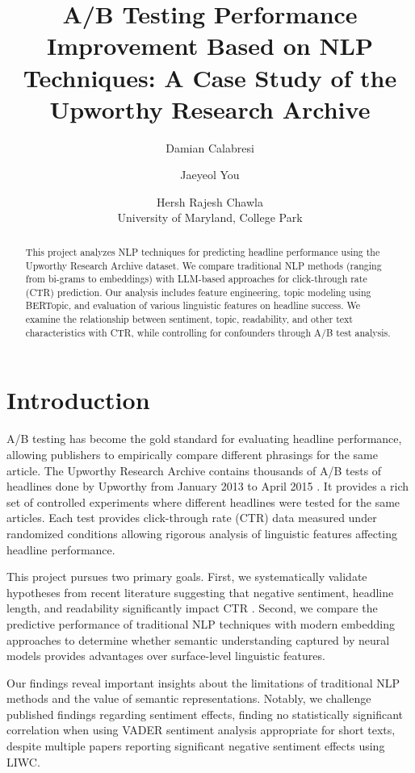 \documentclass[11pt]{article}
\title{A/B Testing Performance Improvement Based on NLP Techniques: A Case Study of the Upworthy Research Archive}
\author{
  Damian Calabresi \and
  Jaeyeol You \and
  Hersh Rajesh Chawla \\
  University of Maryland, College Park
}
\begin{document}
\maketitle

\begin{abstract}
This project analyzes NLP techniques for predicting headline performance using the Upworthy Research Archive dataset. We compare traditional NLP methods (ranging from bi-grams to embeddings) with LLM-based approaches for click-through rate (CTR) prediction. Our analysis includes feature engineering, topic modeling using BERTopic, and evaluation of various linguistic features on headline success. We examine the relationship between sentiment, topic, readability, and other text characteristics with CTR, while controlling for confounders through A/B test analysis.
\end{abstract}

\section{Introduction}

A/B testing has become the gold standard for evaluating headline performance, allowing publishers to empirically compare different phrasings for the same article. The Upworthy Research Archive contains thousands of A/B tests of headlines done by Upworthy from January 2013 to April 2015 \cite{matias2021upworthy}. It provides a rich set of controlled experiments where different headlines were tested for the same articles. Each test provides click-through rate (CTR) data measured under randomized conditions allowing rigorous analysis of linguistic features affecting headline performance.

This project pursues two primary goals. First, we systematically validate hypotheses from recent literature suggesting that negative sentiment, headline length, and readability significantly impact CTR \cite{robertson2023negativity, munger2023linguistic}. Second, we compare the predictive performance of traditional NLP techniques with modern embedding approaches to determine whether semantic understanding captured by neural models provides advantages over surface-level linguistic features.

Our findings reveal important insights about the limitations of traditional NLP methods and the value of semantic representations. Notably, we challenge published findings regarding sentiment effects, finding no statistically significant correlation when using VADER sentiment analysis appropriate for short texts, despite multiple papers reporting significant negative sentiment effects using LIWC.
\end{document}
